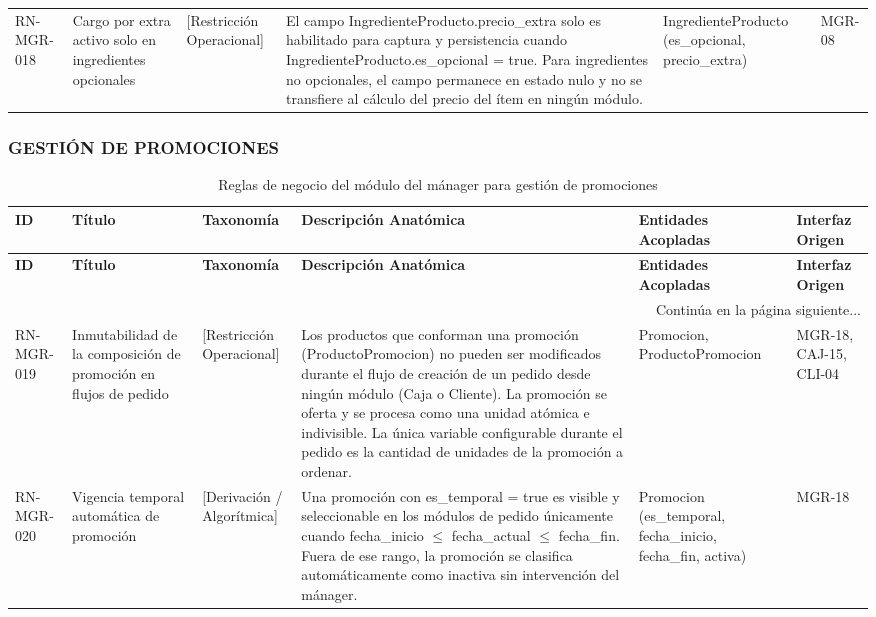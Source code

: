 \begin{landscape}
\begin{longtable}[c]{l p{2.1cm} p{2.1cm} p{8cm} p{4cm} p{3cm}}
\addlinespace
RN-MGR-018 & Cargo por extra activo solo en ingredientes opcionales & [Restricción Operacional] & El campo IngredienteProducto.precio\_extra solo es habilitado para captura y persistencia cuando IngredienteProducto.es\_opcional = true. Para ingredientes no opcionales, el campo permanece en estado nulo y no se transfiere al cálculo del precio del ítem en ningún módulo. & IngredienteProducto (es\_opcional, precio\_extra) & MGR-08 \\
\end{longtable}
\endgroup

\subsubsection{GESTIÓN DE PROMOCIONES}
\begingroup
\setlength{\LTleft}{\fill}
\setlength{\LTright}{\fill}

\begin{longtable}[c]{l p{2.1cm} p{2.1cm} p{8cm} p{4cm} p{3cm}}
\caption{Reglas de negocio del módulo del mánager para gestión de promociones} \label{tab:reglas-negocio-manager-promociones}\\
\toprule
\textbf{ID} & \textbf{Título} & \textbf{Taxonomía} & \textbf{Descripción Anatómica} & \textbf{Entidades Acopladas} & \textbf{Interfaz Origen} \\
\midrule
\endfirsthead

\toprule
\textbf{ID} & \textbf{Título} & \textbf{Taxonomía} & \textbf{Descripción Anatómica} & \textbf{Entidades Acopladas} & \textbf{Interfaz Origen} \\
\midrule
\endhead

\midrule
\multicolumn{6}{r}{\small Continúa en la página siguiente...} \\
\endfoot
\bottomrule
\endlastfoot

RN-MGR-019 & Inmutabilidad de la composición de promoción en flujos de pedido & [Restricción Operacional] & Los productos que conforman una promoción (ProductoPromocion) no pueden ser modificados durante el flujo de creación de un pedido desde ningún módulo (Caja o Cliente). La promoción se oferta y se procesa como una unidad atómica e indivisible. La única variable configurable durante el pedido es la cantidad de unidades de la promoción a ordenar. & Promocion, ProductoPromocion & MGR-18, CAJ-15, CLI-04 \\
\addlinespace
RN-MGR-020 & Vigencia temporal automática de promoción & [Derivación / Algorítmica] & Una promoción con es\_temporal = true es visible y seleccionable en los módulos de pedido únicamente cuando fecha\_inicio $\le$ fecha\_actual $\le$ fecha\_fin. Fuera de ese rango, la promoción se clasifica automáticamente como inactiva sin intervención del mánager. & Promocion (es\_temporal, fecha\_inicio, fecha\_fin, activa) & MGR-18 \\
\end{longtable}
\endgroup


\end{landscape}
